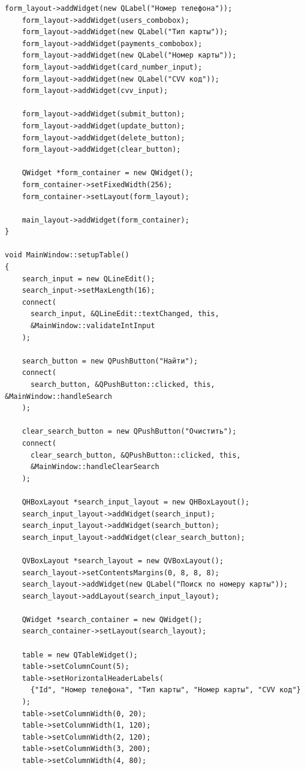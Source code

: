 \documentclass[a4paper,14pt]{extarticle}
\begin{document}
\begin{Verbatim}[tabsize=4,fontsize=\small]
    form_layout->addWidget(new QLabel("Номер телефона"));
    form_layout->addWidget(users_combobox);
    form_layout->addWidget(new QLabel("Тип карты"));
    form_layout->addWidget(payments_combobox);
    form_layout->addWidget(new QLabel("Номер карты"));
    form_layout->addWidget(card_number_input);
    form_layout->addWidget(new QLabel("CVV код"));
    form_layout->addWidget(cvv_input);
    
    form_layout->addWidget(submit_button);
    form_layout->addWidget(update_button);
    form_layout->addWidget(delete_button);
    form_layout->addWidget(clear_button);

    QWidget *form_container = new QWidget();
    form_container->setFixedWidth(256);
    form_container->setLayout(form_layout);

    main_layout->addWidget(form_container);
}

void MainWindow::setupTable()
{
    search_input = new QLineEdit();
    search_input->setMaxLength(16);
    connect(
      search_input, &QLineEdit::textChanged, this,
      &MainWindow::validateIntInput
    );

    search_button = new QPushButton("Найти");
    connect(
      search_button, &QPushButton::clicked, this, &MainWindow::handleSearch
    );

    clear_search_button = new QPushButton("Очистить");
    connect(
      clear_search_button, &QPushButton::clicked, this, 
      &MainWindow::handleClearSearch
    );

    QHBoxLayout *search_input_layout = new QHBoxLayout();
    search_input_layout->addWidget(search_input);
    search_input_layout->addWidget(search_button);
    search_input_layout->addWidget(clear_search_button);

    QVBoxLayout *search_layout = new QVBoxLayout();
    search_layout->setContentsMargins(0, 8, 8, 8);
    search_layout->addWidget(new QLabel("Поиск по номеру карты"));
    search_layout->addLayout(search_input_layout);

    QWidget *search_container = new QWidget();
    search_container->setLayout(search_layout);

    table = new QTableWidget();
    table->setColumnCount(5);   
    table->setHorizontalHeaderLabels(
      {"Id", "Номер телефона", "Тип карты", "Номер карты", "CVV код"}
    );
    table->setColumnWidth(0, 20);
    table->setColumnWidth(1, 120);
    table->setColumnWidth(2, 120);
    table->setColumnWidth(3, 200);
    table->setColumnWidth(4, 80);


\end{Verbatim}
\end{document}
